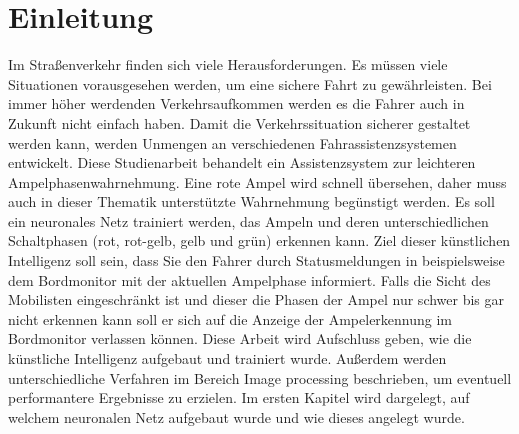 \documentclass[a4paper,oneside,12pt]{report}
\begin{document}
	
	
	\tableofcontents
	\cleardoublepage
	
	
	\chapter{Einleitung}
	\begin{onehalfspace}
		Im Straßenverkehr finden sich viele Herausforderungen. Es müssen viele Situationen vorausgesehen werden, um eine sichere Fahrt zu gewährleisten. Bei immer höher werdenden Verkehrsaufkommen werden es die Fahrer auch in Zukunft nicht einfach haben. Damit die Verkehrssituation sicherer gestaltet werden kann, werden Unmengen an verschiedenen Fahrassistenzsystemen entwickelt. Diese Studienarbeit behandelt ein Assistenzsystem zur leichteren Ampelphasenwahrnehmung. Eine rote Ampel wird schnell übersehen, daher muss auch in dieser Thematik unterstützte Wahrnehmung begünstigt werden. Es soll ein neuronales Netz trainiert werden, das Ampeln und deren unterschiedlichen Schaltphasen (rot, rot-gelb, gelb und grün) erkennen kann. Ziel dieser künstlichen Intelligenz soll sein, dass Sie den Fahrer durch Statusmeldungen in beispielsweise dem Bordmonitor mit der aktuellen Ampelphase informiert. Falls die Sicht des Mobilisten eingeschränkt ist und dieser die Phasen der Ampel nur schwer bis gar nicht erkennen kann soll er sich auf die Anzeige der Ampelerkennung im Bordmonitor verlassen können. Diese Arbeit wird Aufschluss geben, wie die künstliche Intelligenz aufgebaut und trainiert wurde. Außerdem werden unterschiedliche Verfahren im Bereich Image processing beschrieben, um eventuell performantere Ergebnisse zu erzielen. Im ersten Kapitel wird dargelegt, auf welchem neuronalen Netz aufgebaut wurde und wie dieses angelegt wurde.
	\end{onehalfspace}
\end{document}
